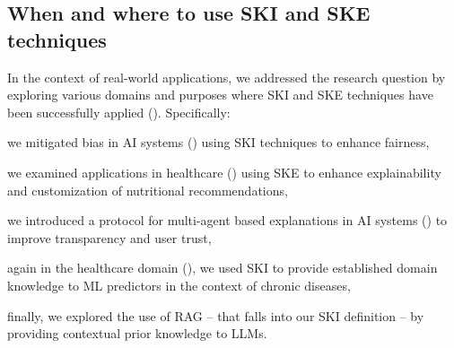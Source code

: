 \subsection*{When and where to use \gls{SKI} and \gls{SKE} techniques}
%
In the context of real-world applications, we addressed the research question  by exploring various domains and purposes where \gls{SKI} and \gls{SKE} techniques have been successfully applied ().
%
Specifically:
%
\begin{inlinelist}
    \item we mitigated bias in \gls{AI} systems () using \gls{SKI} techniques to enhance fairness,
    \item we examined applications in healthcare () using \gls{SKE} to enhance explainability and customization of nutritional recommendations,
    \item we introduced a protocol for multi-agent based explanations in \gls{AI} systems () to improve transparency and user trust,
    \item again in the healthcare domain (), we used \gls{SKI} to provide established domain knowledge to \gls{ML} predictors in the context of chronic diseases,
    \item finally, we explored the use of \gls{RAG} -- that falls into our \gls{SKI} definition -- by providing contextual prior knowledge to \glspl{LLM}.
\end{inlinelist}


